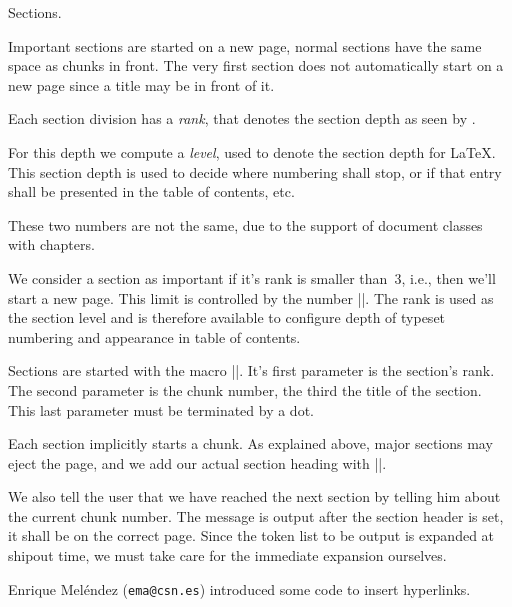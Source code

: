 \documentclass{progltx}
\begin{document}
\def\cwbb@string@chunk{chunk}
\def\refstepcounter#1{%
    \def\@tempa{#1}%
    \ifx \@tempa\cwbb@string@chunk
        \protected@edef\@currentlabel{\cwbb@refchunk}%
    \else
    	\cwbb@refstepcounter{#1}%
    \fi
    }
\endprog




\chap Sections.

Important sections are started on a new page, normal sections have the
same space as chunks in front. The very first section does not
automatically start on a new page since a title may be in front of it.

Each section division has a \textsl{rank}, that denotes the section
depth as seen by \cweave{}.

For this depth we compute a \textsl{level}, used to denote the section
depth for \LaTeX{}. This section depth is used to decide where
numbering shall stop, or if that entry shall be presented in the table
of contents, etc.

These two numbers are not the same, due to the support of document
classes with chapters.

We consider a section as important if it's rank is smaller than~3,
i.e., then we'll start a new page. This limit is controlled by the
number |\CwebRankNoEject|. The rank is used as the section level
and is therefore available to configure depth of typeset numbering and
appearance in table of contents.

\beginprog
\def\CwebRankNoEject{3}
\endprog


\sect Sections are started with the macro |\N|. It's first parameter
is the section's rank. The second parameter is the chunk number, the
third the title of the section. This last parameter must be terminated
by a dot.

Each section implicitly starts a chunk. As explained above, major
sections may eject the page, and we add our actual section heading
with |\CwebSection|.

We also tell the user that we have reached the next section by telling
him about the current chunk number. The message is output after the
section header is set, it shall be on the correct page. Since the
token list to be output is expanded at shipout time, we must take care
for the immediate expansion ourselves.

Enrique Mel\'endez (\texttt{ema@csn.es}) introduced some code to insert
hyperlinks.
\beginprog
\def\N#1#2#3.{%
   \cwbb@start_chunk{#2}%
    \CwebEjectSection{#1}%
    \hypertarget{_hypersect_#2}{}%
   \CwebSection{#1}{#3}%
    \begingroup
        \def\*{}%
        \edef\tmp{*#2}%
        \message \expandafter{\tmp}%
    \endgroup
    }
\endprog
\end{document}
